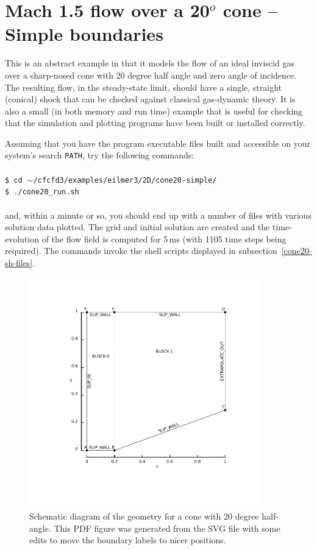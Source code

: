 
\section{Mach 1.5 flow over a 20$^o$ cone -- Simple boundaries}
\label{cone20-simple-sec}
%
This is an abstract example in that it models the flow of an ideal inviscid gas
over a sharp-nosed cone with 20 degree half angle and zero angle of incidence.
The resulting flow, in the steady-state limit, should have a single, 
straight (conical) shock that can be checked against classical gas-dynamic theory.
It is also a small (in both memory and run time) example 
that is useful for checking that the simulation and
plotting programs have been built or installed correctly.

\medskip
Assuming that you have the program executable files built and
accessible on your system's search \texttt{PATH}, 
try the following commands:\\
%
\topbar\\
\texttt{\$ cd $\sim$/cfcfd3/examples/eilmer3/2D/cone20-simple/}\\
\texttt{\$ ./cone20\_run.sh}\\
\bottombar\\
%
and, within a minute or so, you should end up with a number of files
with various solution data plotted.
The grid and initial solution are created and the time-evolution of the
flow field is computed for 5\,ms (with 1105 time steps being required).
The commands invoke the shell scripts displayed in 
subsection~\ref{cone20-sh-files}.
%

\begin{figure}[htbp]
\begin{center}
\includegraphics[width=10cm, viewport=76 78 389 398]{../2D/cone20-simple/cone20_svg.pdf}
\end{center}
\caption{Schematic diagram of the geometry for a cone 
         with 20 degree half-angle.
	 This PDF figure was generated from the SVG file with some edits 
	 to move the boundary labels to nicer positions.}
\label{cone20-geometry-fig}
\end{figure}

